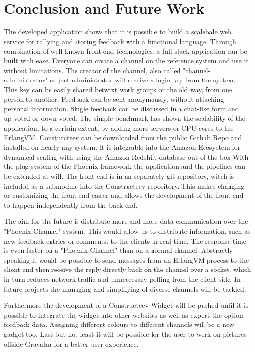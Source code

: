 \chapter{Conclusion and Future Work}
The developed application shows that it is possible to build a scalebale web service for rallying and storing feedback with a functional language. Through combination of well-known front-end technologies, a full stack application can be built with ease. 
Everyone can create a channel on the reference system and use it without limitations. 
The creator of the channel, also called "channel-administrator" or just administrator will receive a login-key from the system. This key can be easily shared betwixt work groups or the old way, from one person to another. 
Feedback can be sent anonymously, without attaching personal information. Single feedback can be discussed in a chat-like form and up-voted or down-voted. 
The simple benchmark has shown the scalability of the application, to a certain extent, by adding more servers or CPU cores to the ErlangVM.
\textcolor{newcode}{Consturcteev can be downloaded from the public Github Repo and installed on nearly any system. It is integrable into the Amazon Ecosystem for dynamical scaling with using the Amazon Redshift database out of the box
With the plug system of the Phoenix framework the application and the pipelines can be extended at will. The front-end is in an separately git repository, witch is included as a submodule into the Constructeev repository. This makes changing or customizing the front-end easier and allows the development of the front-end to happen independently from the back-end.}

\textcolor{newcode}{The aim for the future is distribute more and more data-communication over the "Phoenix Channel" system. This would allow us to distribute information, such as new feedback entries or comments, to the clients in real-time. The response time is even faster on a "Phoenix Channel" than on a normal channel. Abstractly speaking it would be possible to send messages from an ErlangVM process to the client and then receive the reply directly back on the channel over a socket, which in turn reduces network traffic and unneccesary polling from the client side.}
In future projects the managing and simplifying of diverse channels will be tackled.

Furthermore the development of a Constructeev-Widget will be pushed until it is possible to integrate the widget into other websites as well as export the option-feedback-data. Assigning different colours to different channels will be a new gadget too. Last but not least it will be possible for the user to work on pictures offside Gravatar for a better user experience.
\cleardoublepage
\appendixheader

